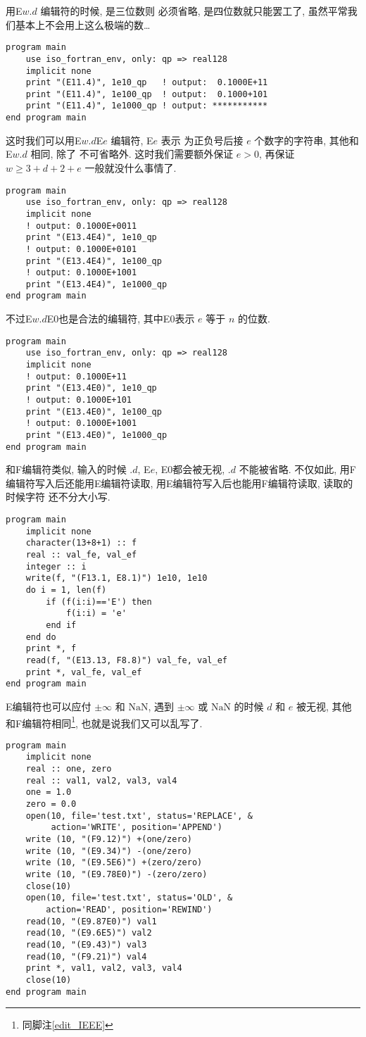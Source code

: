 用E$ w. d $ 编辑符的时候,  是三位数则  必须省略,  是四位数就只能罢工了, 虽然平常我们基本上不会用上这么极端的数\dots{}
\begin{lstlisting}
program main
    use iso_fortran_env, only: qp => real128
    implicit none
    print "(E11.4)", 1e10_qp   ! output:  0.1000E+11
    print "(E11.4)", 1e100_qp  ! output:  0.1000+101
    print "(E11.4)", 1e1000_qp ! output: ***********
end program main
\end{lstlisting}
这时我们可以用E$ w. d $E$ e $ 编辑符, E$ e $ 表示  为正负号后接 $ e $ 个数字的字符串, 其他和E$ w. d $ 相同, 除了  不可省略外. 这时我们需要额外保证 $ e>0 $, 再保证 $ w\geqslant 3+d+2+e $ 一般就没什么事情了. 
\begin{lstlisting}
program main
    use iso_fortran_env, only: qp => real128
    implicit none
    ! output: 0.1000E+0011
    print "(E13.4E4)", 1e10_qp
    ! output: 0.1000E+0101
    print "(E13.4E4)", 1e100_qp
    ! output: 0.1000E+1001
    print "(E13.4E4)", 1e1000_qp
end program main
\end{lstlisting}
不过E$ w. d $E0也是合法的编辑符, 其中E0表示 $ e $ 等于 $ n $ 的位数.
\begin{lstlisting}
program main
    use iso_fortran_env, only: qp => real128
    implicit none
    ! output: 0.1000E+11
    print "(E13.4E0)", 1e10_qp
    ! output: 0.1000E+101
    print "(E13.4E0)", 1e100_qp
    ! output: 0.1000E+1001
    print "(E13.4E0)", 1e1000_qp
end program main
\end{lstlisting}

和F编辑符类似, 输入的时候 $. d $, E$e $, E0都会被无视, $. d$ 不能被省略. 不仅如此, 用F编辑符写入后还能用E编辑符读取, 用E编辑符写入后也能用F编辑符读取, 读取的时候字符  还不分大小写. 
\begin{lstlisting}
program main
    implicit none
    character(13+8+1) :: f
    real :: val_fe, val_ef
    integer :: i
    write(f, "(F13.1, E8.1)") 1e10, 1e10
    do i = 1, len(f)
        if (f(i:i)=='E') then
            f(i:i) = 'e'
        end if
    end do
    print *, f
    read(f, "(E13.13, F8.8)") val_fe, val_ef
    print *, val_fe, val_ef
end program main
\end{lstlisting}

E编辑符也可以应付 $ \pm\infty $ 和 $ \text{NaN} $, 遇到 $ \pm\infty $ 或 $ \text{NaN} $ 的时候 $ d $ 和 $ e $ 被无视, 其他和F编辑符相同\footnote{同脚注\ref{edit_IEEE}}, 也就是说我们又可以乱写了. 
\begin{lstlisting}
program main
    implicit none
    real :: one, zero
    real :: val1, val2, val3, val4
    one = 1.0
    zero = 0.0
    open(10, file='test.txt', status='REPLACE', &
         action='WRITE', position='APPEND')
    write (10, "(F9.12)") +(one/zero)
    write (10, "(E9.34)") -(one/zero)
    write (10, "(E9.5E6)") +(zero/zero)
    write (10, "(E9.78E0)") -(zero/zero)
    close(10)
    open(10, file='test.txt', status='OLD', &
        action='READ', position='REWIND')
    read(10, "(E9.87E0)") val1
    read(10, "(E9.6E5)") val2
    read(10, "(E9.43)") val3
    read(10, "(F9.21)") val4
    print *, val1, val2, val3, val4
    close(10)
end program main
\end{lstlisting}

